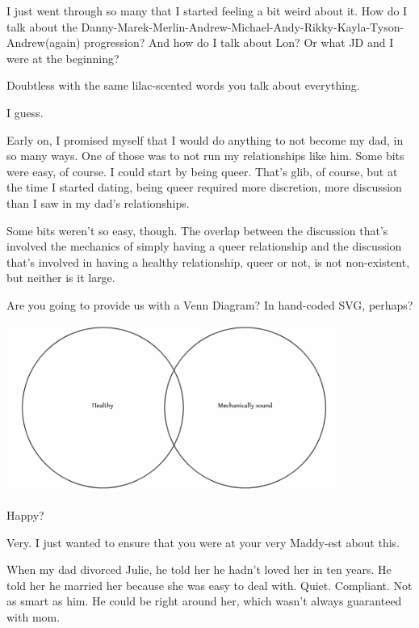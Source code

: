 \begin{paracol}{2}
\begin{leftcolumn}
I just went through so many that I started feeling a bit weird about it. How do I talk about the Danny-Marek-Merlin-Andrew-Michael-Andy-Rikky-Kayla-Tyson-Andrew(again) progression? And how do I talk about Lon? Or what JD and I were at the beginning?

\begin{ally}
Doubtless with the same lilac-scented words you talk about everything.
\end{ally}
I guess.

Early on, I promised myself that I would do anything to not become my dad, in so many ways. One of those was to not run my relationships like him. Some bits were easy, of course. I could start by being queer. That's glib, of course, but at the time I started dating, being queer required more discretion, more discussion than I saw in my dad's relationships.

Some bits weren't so easy, though. The overlap between the discussion that's involved the mechanics of simply having a queer relationship and the discussion that's involved in having a healthy relationship, queer or not, is not non-existent, but neither is it large.

\begin{ally}
Are you going to provide us with a Venn Diagram? In hand-coded SVG, perhaps?
\end{ally}


\noindent\includegraphics[width=4.25in]{assets/static/healthy-sound.png}

Happy?

\begin{ally}
Very. I just wanted to ensure that you were at your very Maddy-est about this.
\end{ally}
When my dad divorced Julie, he told her he hadn't loved her in ten years. He told her he married her because she was easy to deal with. Quiet. Compliant. Not as smart as him. He could be right around her, which wasn't always guaranteed with mom.


\end{leftcolumn}
\end{paracol}
